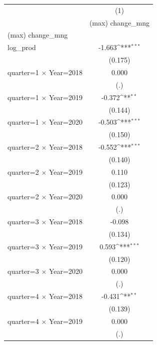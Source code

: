 {
\def\sym#1{\ifmmode^{#1}\else\(^{#1}\)\fi}
\begin{tabular}{l*{1}{c}}
\hline\hline
                    &\multicolumn{1}{c}{(1)}\\
                    &\multicolumn{1}{c}{(max) change\_mng}\\
\hline
(max) change\_mng    &                     \\
log\_prod            &      -1.663\sym{***}\\
                    &     (0.175)         \\
[1em]
quarter=1 $\times$ Year=2018&       0.000         \\
                    &         (.)         \\
[1em]
quarter=1 $\times$ Year=2019&      -0.372\sym{**} \\
                    &     (0.144)         \\
[1em]
quarter=1 $\times$ Year=2020&      -0.503\sym{***}\\
                    &     (0.150)         \\
[1em]
quarter=2 $\times$ Year=2018&      -0.552\sym{***}\\
                    &     (0.140)         \\
[1em]
quarter=2 $\times$ Year=2019&       0.110         \\
                    &     (0.123)         \\
[1em]
quarter=2 $\times$ Year=2020&       0.000         \\
                    &         (.)         \\
[1em]
quarter=3 $\times$ Year=2018&      -0.098         \\
                    &     (0.134)         \\
[1em]
quarter=3 $\times$ Year=2019&       0.593\sym{***}\\
                    &     (0.120)         \\
[1em]
quarter=3 $\times$ Year=2020&       0.000         \\
                    &         (.)         \\
[1em]
quarter=4 $\times$ Year=2018&      -0.431\sym{**} \\
                    &     (0.139)         \\
[1em]
quarter=4 $\times$ Year=2019&       0.000         \\
                    &         (.)         \\

\end{tabular}}
